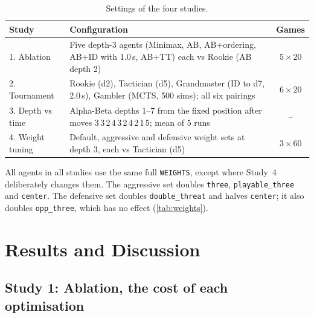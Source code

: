 \documentclass[11pt,a4paper]{article}
\newcommand{\code}[1]{\texttt{\small #1}}
\begin{document}
\begin{table}[ht]
\centering\small
\caption{Settings of the four studies.}\label{tab:settings}
\begin{tabularx}{\textwidth}{@{}l Y c@{}}
\toprule
\textbf{Study} & \textbf{Configuration} & \textbf{Games} \\
. Ablation & Five depth-3 agents (Minimax, AB, AB+ordering, AB+ID with 1.0\,s, AB+TT) each vs Rookie (AB depth 2) & $5\times20$ \\
2. Tournament & Rookie (d2), Tactician (d5), Grandmaster (ID to d7, 2.0\,s), Gambler (MCTS, 500 sims); all six pairings & $6\times20$ \\
3. Depth vs time & Alpha-Beta depths 1--7 from the fixed position after moves 3\,3\,2\,4\,3\,2\,4\,2\,1\,5; mean of 5 runs & -- \\
4. Weight tuning & Default, aggressive and defensive weight sets at depth 3, each vs Tactician (d5) & $3\times60$ \\
\bottomrule
\end{tabularx}
\end{table}

All agents in all studies use the same full \code{WEIGHTS}, except where Study~4 deliberately changes them. The aggressive set doubles \code{three}, \code{playable\_three} and \code{center}. The defensive set doubles \code{double\_threat} and halves \code{center}; it also doubles \code{opp\_three}, which has no effect (\cref{tab:weights}).

\section{Results and Discussion}\label{sec:results}

\subsection{Study 1: Ablation, the cost of each optimisation}
\end{document}
